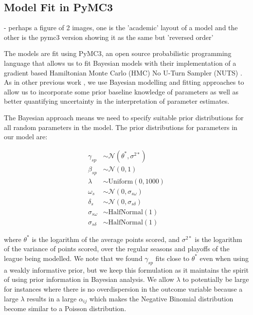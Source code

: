 \subsection{Model Fit in PyMC3}

- perhaps a figure of 2 images, one is the 'academic' layout of a model and the other is the pymc3 version showing it as the same but 'reversed order'

The models are fit using PyMC3, an open source probabilistic programming language that allows us to fit Bayesian models with their implementation of a gradient based Hamiltonian Monte Carlo (HMC) No U-Turn Sampler (NUTS) \cite{pymc3}. As in other previous work \cite{Baio2010} \cite{Benz2020}, we use Bayesian modelling and fitting approaches to allow us to incorporate some prior baseline knowledge of parameters as well as better quantifying uncertainty in the interpretation of parameter estimates.

The Bayesian approach means we need to specify suitable prior distributions for all random parameters in the model. The prior distributions for parameters in our model are:

\begin{equation} \label{eq:priors}
\begin{split}
\gamma_{sp} &\sim \mathcal{N}(\theta^*, \sigma^{2*}) \\
\beta_{sp} &\sim \mathcal{N}(0, 1) \\
\lambda &\sim \text{Uniform}(0, 1000) \\
\omega_s &\sim \mathcal{N}(0, \sigma_{s\omega}) \\
\delta_s &\sim \mathcal{N}(0, \sigma_{s\delta}) \\
\sigma_{s\omega} &\sim \text{HalfNormal}(1) \\
\sigma_{s\delta} &\sim \text{HalfNormal}(1)
\end{split}
\end{equation}

where \(\theta^*\) is the logarithm of the average points scored, and \(\sigma^{2*}\) is the logarithm of the variance of points scored, over the regular seasons and playoffs of the league being modelled. We note that we found \(\gamma_{sp}\) fits close to \(\theta^*\) even when using a weakly informative prior, but we keep this formulation as it maintains the spirit of using prior information in Bayesian analysis. We allow \(\lambda\) to potentially be large for instances where there is no overdispersion in the outcome variable because a large \(\lambda\) results in a large \(\alpha_{ij}\) which makes the Negative Binomial distribution become similar to a Poisson distribution.

